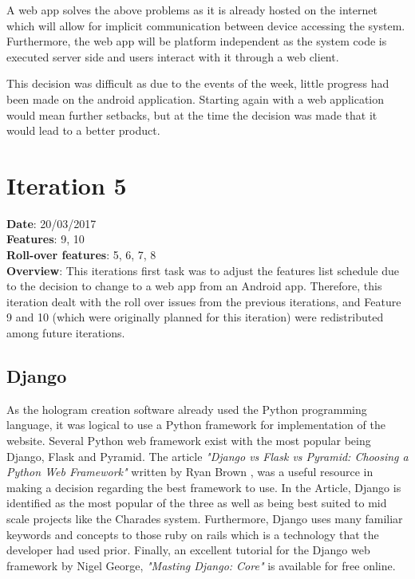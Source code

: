 A web app solves the above problems as it is already hosted on the internet which will allow for implicit communication between device accessing the system. Furthermore, the web app will be platform independent as the system code is executed server side and users interact with it through a web client.

This decision was difficult as due to the events of the week, little progress had been made on the android application. Starting again with a web application would mean further setbacks, but at the time the decision was made that it would lead to a better product.

\newpage

\section{Iteration 5}
\textbf{Date}: 20/03/2017 \\
\textbf{Features}: 9, 10 \\
\textbf{Roll-over features}: 5, 6, 7, 8 \\
\textbf{Overview}: This iterations first task was to adjust the features list schedule due to the decision to change to a web app from an Android app. Therefore, this iteration dealt with the roll over issues from the previous iterations, and Feature 9 and 10 (which were originally planned for this iteration) were redistributed among future iterations.

\subsection{Django}
As the hologram creation software already used the Python programming language, it was logical to use a Python framework for implementation of the website. Several Python web framework exist with the most popular being Django, Flask and Pyramid. The article \textit{"Django vs Flask vs Pyramid: Choosing a Python Web Framework"} written by Ryan Brown \cite{python_webframework_comparison}, was a useful resource in making a decision regarding the best framework to use. In the Article, Django is identified as the most popular of the three as well as being best suited to mid scale projects like the Charades system. Furthermore, Django uses many familiar keywords and concepts to those ruby on rails which is a technology that the developer had used prior. Finally, an excellent tutorial for the Django web framework by Nigel George, \textit{"Masting Django: Core"} \cite{django_book} is available for free online. 

